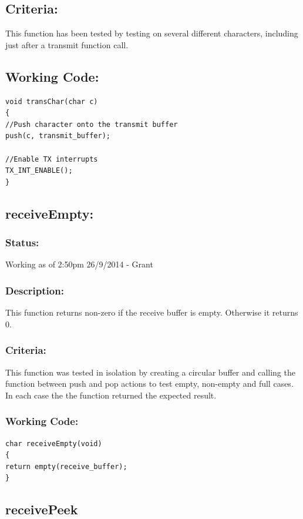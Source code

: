 \documentclass[]{report}
\begin{document}
\subsection{Criteria:}
This function has been tested by testing on several different characters,  including just after a transmit function call.

\subsection{Working Code:}
\begin{lstlisting}
void transChar(char c)
{
//Push character onto the transmit buffer
push(c, transmit_buffer);

//Enable TX interrupts
TX_INT_ENABLE();
}
\end{lstlisting}

\subsection{receiveEmpty:}
\subsubsection{Status:}
Working as of 2:50pm 26/9/2014 - Grant

\subsubsection{Description:}
This function returns non-zero if the receive buffer is empty. Otherwise it returns 0.

\subsubsection{Criteria:}
This function was tested in isolation by creating a circular buffer and calling the function between push and pop actions to test empty, non-empty and full cases. In each case the the function returned the expected result.

\subsubsection{Working Code:}
\begin{lstlisting}
char receiveEmpty(void)
{
return empty(receive_buffer);
}
\end{lstlisting}


\subsection{receivePeek}
\end{document}
